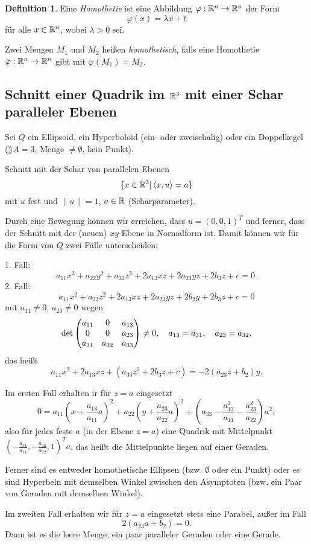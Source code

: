 \documentclass[
 a4paper,
 12pt,
 parskip=half
 ]{scrartcl}
\theoremstyle{plain}
\theoremstyle{definition}
\newtheorem*{defn*}{Definition}
\begin{document}
\begin{defn*}
  Eine \emph{Homothetie} ist eine Abbildung $\varphi: \mathbb{R}^n \to \mathbb{R}^n$ der
  Form
  \[ \varphi(x) = \lambda x + t \]
  für alle $x \in \mathbb{R}^n$, wobei $\lambda > 0$ sei.

  Zwei Mengen $M_1$ und $M_2$ heißen \emph{homothetisch}, falls eine Homothetie
  $\varphi:\mathbb{R}^n \to \mathbb{R}^n$ gibt mit $\varphi(M_1) = M_2$.
\end{defn*}

\subsection*{Schnitt einer Quadrik im $\mathbb{R}^3$ mit einer Schar paralleler Ebenen}
Sei $Q$ ein Ellipsoid, ein Hyperboloid (ein- oder zweischalig) oder ein
Doppelkegel ($\rang A = 3$, Menge $\ne \emptyset$, kein Punkt).

Schnitt mit der Schar von parallelen Ebenen
\[ \{ x \in \mathbb{R}^3 | \left\langle x,u \right\rangle = a \} \]
mit $u$ fest und $\| u \| = 1$, $a \in \mathbb{R}$ (Scharparameter).

Durch eine Bewegung können wir erreichen, dass $u = (0,0,1)^T$ und ferner, dass
der Schnitt mit der (neuen) $xy$-Ebene in Normalform ist. Damit können wir für
die Form von $Q$ zwei Fälle unterscheiden:

1. Fall:
\[ a_{11} x^2 + a_{22} y^2 + a_{33} z^2 + 2 a_{13}xz + 2 a_{23} yz + 2 b_3 z +
  c = 0. \]
2. Fall:
\[ a_{11} x^2 + a_{33} z^2 + 2 a_{13}xz + 2 a_{23} yz + 2 b_2 y + 2 b_3 z +
  c = 0 \]
mit $a_{11} \ne 0$, $a_{23} \ne 0$ wegen
\[ \det \begin{pmatrix} a_{11} & 0 & a_{13} \\ 0 & 0 & a_{23} \\ a_{31} & a_{32} &
    a_{33}\end{pmatrix} \ne 0, \quad a_{13} = a_{31}, \quad a_{23} = a_{32}, \]
das heißt
\[ a_{11} x^2 + 2 a_{13} xz + (a_{33} z^2 + 2 b_3 z + c) = -2(a_{23}z +
  b_2)y. \] 

Im ersten Fall erhalten ir für $z=a$ eingesetzt
\[ 0 = a_{11} \left( x + \frac{a_{13}}{a_{11}} a \right)^2
  + a_{22} \left( y + \frac{a_{23}}{a_{22}} a \right)^2
  + \left( a_{33} - \frac{a_{13}^2}{a_{11}} - \frac{a_{23}^2}{a_{22}} \right)
  a^2, \]
also für jedes feste $a$ (in der Ebene $z=a$) eine Quadrik mit Mittelpunkt
$(-\frac{a_{31}}{a_{11}}, -\frac{a_{32}}{a_{22}}, 1)^T a$, das heißt die
Mittelpunkte liegen auf einer Geraden.

Ferner sind es entweder homothetische Ellipsen (bzw. $\emptyset$ oder ein Punkt)
oder es sind Hyperbeln mit demselben Winkel zwischen den Asymptoten (bzw. ein
Paar von Geraden mit demselben Winkel).

Im zweiten Fall erhalten wir für $z=a$ eingesetzt stets eine Parabel, außer im
Fall
\[ 2(a_{23}a + b_2) = 0. \]
Dann ist es die leere Menge, ein paar paralleler Geraden oder eine Gerade.
\end{document}
